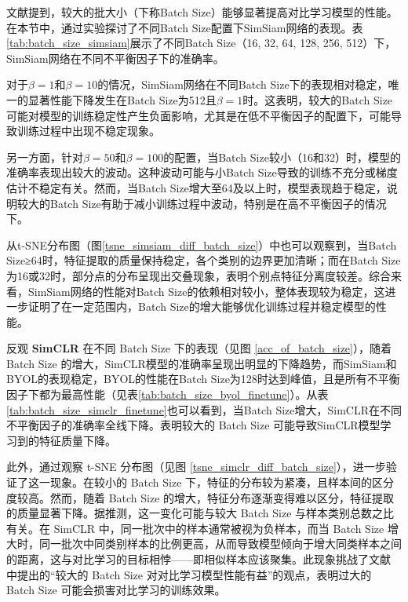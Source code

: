\documentclass[master]{thesis-uestc}
\begin{document}
文献\cite{chen2020simple}提到，较大的批大小（下称Batch Size）能够显著提高对比学习模型的性能。在本节中，通过实验探讨了不同Batch Size配置下SimSiam网络的表现。表\ref{tab:batch_size_simsiam}展示了不同Batch Size（16, 32, 64, 128, 256, 512）下，SimSiam网络在不同不平衡因子下的准确率。

对于$\beta=1$和$\beta=10$的情况，SimSiam网络在不同Batch Size下的表现相对稳定，唯一的显著性能下降发生在Batch Size为512且$\beta=1$时。这表明，较大的Batch Size可能对模型的训练稳定性产生负面影响，尤其是在低不平衡因子的配置下，可能导致训练过程中出现不稳定现象。

另一方面，针对$\beta=50$和$\beta=100$的配置，当Batch Size较小（16和32）时，模型的准确率表现出较大的波动。这种波动可能与小Batch Size导致的训练不充分或梯度估计不稳定有关。然而，当Batch Size增大至64及以上时，模型表现趋于稳定，说明较大的Batch Size有助于减小训练过程中波动，特别是在高不平衡因子的情况下。

从t-SNE分布图（图\ref{tsne_simsiam_diff_batch_size}）中也可以观察到，当Batch Size≥64时，特征提取的质量保持稳定，各个类别的边界更加清晰；而在Batch Size为16或32时，部分点的分布呈现出交叠现象，表明个别点特征分离度较差。综合来看，SimSiam网络的性能对Batch Size的依赖相对较小，整体表现较为稳定，这进一步证明了在一定范围内，Batch Size的增大能够优化训练过程并稳定模型的性能。

反观 \textbf{SimCLR} 在不同 Batch Size 下的表现（见图 \ref{acc_of_batch_size}），随着 Batch Size 的增大，SimCLR模型的准确率呈现出明显的下降趋势，而SimSiam和BYOL的表现稳定，BYOL的性能在Batch Size为128时达到峰值，且是所有不平衡因子下都为最高性能（见表\ref{tab:batch_size_byol_finetune}）。从表\ref{tab:batch_size_simclr_finetune}也可以看到，当Batch Size增大，SimCLR在不同不平衡因子的准确率全线下降。表明较大的 Batch Size 可能导致SimCLR模型学习到的特征质量下降。

此外，通过观察 t-SNE 分布图（见图 \ref{tsne_simclr_diff_batch_size}），进一步验证了这一现象。在较小的 Batch Size 下，特征的分布较为紧凑，且样本间的区分度较高。然而，随着 Batch Size 的增大，特征分布逐渐变得难以区分，特征提取的质量显著下降。据推测，这一变化可能与较大 Batch Size 与样本类别总数之比有关。在 SimCLR 中，同一批次中的样本通常被视为负样本，而当 Batch Size 增大时，同一批次中同类别样本的比例更高，从而导致模型倾向于增大同类样本之间的距离，这与对比学习的目标相悖——即相似样本应该聚集。此现象挑战了文献 \cite{chen2020simple} 中提出的“较大的 Batch Size 对对比学习模型性能有益”的观点，表明过大的 Batch Size 可能会损害对比学习的训练效果。
\end{document}
